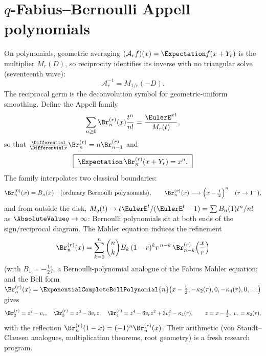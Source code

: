 \documentclass[11pt,oneside]{article}
\numberwithin{equation}{section}
\theoremstyle{definition}
\theoremstyle{remark}
\begin{document}
\section{\texorpdfstring{$q$}{q}-Fabius--Bernoulli Appell polynomials}
\label{p7:sec:appell}

On polynomials, geometric averaging $(\mathcal A_rf)(x)=\Expectation f(x+Y_r)$ is the
multiplier $M_r(D)$, so reciprocity identifies its inverse with no triangular
solve (seventeenth wave):
\begin{equation}\label{p7:eq:averaging-inverse}
 \boxed{\ \mathcal A_r^{-1}=M_{1/r}(-D).\ }
\end{equation}
The reciprocal germ is the deconvolution symbol for geometric-uniform
smoothing.  Define the Appell family
\begin{equation}\label{p7:eq:appell-gen}
 \sum_{n\ge0}\Br_n^{(r)}(x)\frac{t^n}{n!}
 =\frac{\EulerE^{xt}}{M_r(t)},
\end{equation}
so that $\tfrac{\Differential}{\Differential x}\Br_n^{(r)}=n\Br_{n-1}^{(r)}$ and
\begin{equation}\label{p7:eq:appell-deconvolution}
 \boxed{\ \Expectation\,\Br_n^{(r)}(x+Y_r)=x^n.\ }
\end{equation}
The family interpolates two classical boundaries:
\begin{equation}\label{p7:eq:appell-boundaries}
 \Br_n^{(0)}(x)=B_n(x)
 \quad\text{(ordinary Bernoulli polynomials)},
 \qquad
 \Br_n^{(r)}(x)\longrightarrow\Bigl(x-\tfrac12\Bigr)^{n}
 \quad(r\to1^-),
\end{equation}
and from outside the disk,
$M_q(t)\to t\EulerE^t/(\EulerE^t-1)=\sum B_n(1)t^n/n!$ as $\AbsoluteValue q\to\infty$: Bernoulli
polynomials sit at both ends of the sign/reciprocal diagram.  The Mahler
equation induces the refinement
\begin{equation}\label{p7:eq:appell-mahler}
 \Br_n^{(r)}(x)=
 \sum_{k=0}^{n}\binom nk B_k\,(1-r)^kr^{\,n-k}\,
 \Br_{n-k}^{(r)}\!\left(\frac xr\right)
\end{equation}
(with $B_1=-\tfrac12$), a Bernoulli-polynomial analogue of the Fabius Mahler
equation; and the Bell form
$\Br_n^{(r)}(x)=\ExponentialCompleteBellPolynomial{n}\bigl(x-\tfrac12,-\kappa_2(r),0,-\kappa_4(r),0,
\ldots\bigr)$ gives
\[
 \Br_2^{(r)}=z^2-v_r,\quad
 \Br_3^{(r)}=z^3-3v_rz,\quad
 \Br_4^{(r)}=z^4-6v_rz^2+3v_r^2-\kappa_4(r),
 \qquad z=x-\tfrac12,\ v_r=\kappa_2(r),
\]
with the reflection $\Br_n^{(r)}(1-x)=(-1)^n\Br_n^{(r)}(x)$.  Their
arithmetic (von Staudt--Clausen analogues, multiplication theorems, root
geometry) is a fresh research program.
\end{document}
